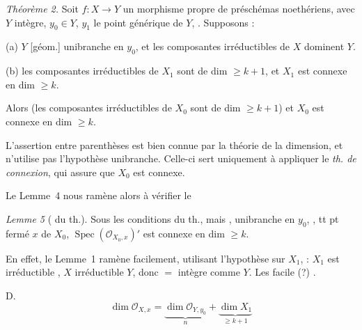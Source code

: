 \documentclass[11pt,a4paper]{article}
\begin{document}
\emph{Théorème 2.} Soit $f\colon X \to Y$ un morphisme \struck{\ill{}} propre de préschémas  noethériens, avec $Y$ intègre, $y_0 \in Y$, $y_1$ \struck{\ill{}} le point générique de $Y$, . Supposons :

(a) $Y$  [géom.] unibranche en $y_0$,
\marginal{\struck{\ill{}} \ill{}}
et les composantes irréductibles de $X$ dominent $Y$.

(b) les composantes irréductibles de  $X_1$ sont de dim $\geq k+1$, et $X_1$ est connexe en dim $\geq k$.

Alors (les composantes irréductibles de $X_0$ sont de dim $\geq k+1$) et $X_0$ est connexe en dim $\geq k$.

L'assertion entre parenthèses est bien connue par la théorie de la dimension, et n'utilise pas l'hypothèse unibranche. Celle-ci sert uniquement à appliquer le \emph{th. de connexion}, qui assure que $X_0$ est connexe.

Le Lemme~4 nous ramène alors à vérifier le

\emph{Lemme 5} ( du th.). Sous les conditions du th., mais \ill{}, \struck{\ill{}}  unibranche en $y_0$, \ill{} \ill{},  tt pt fermé $x$ de $X_0$, \struck{\ill{} \ill{}} $\operatorname{Spec}(\mathcal{O}_{X_0,x})'$ est connexe en dim $\geq k$.

En effet, le Lemme~1  ramène facilement, utilisant l'hypothèse sur $X_1$,  :
$X_1$ est irréductible ,
$X$ irréductible  $Y$, donc $=$ intègre comme $Y$.
Les \ill{} \ill{} \ill{} \ill{} \struck{\ill{}} \ill{}
\struck{\ill{} \ill{}} facile (?) \ill{} \ill{} \ill{} .

D.
\[
  \dim \mathcal{O}_{X,x} = \underbrace{\dim \mathcal{O}_{Y,y_0}}_{n} + \underbrace{\dim X_1}_{\geq k+1}
\]
\end{document}
